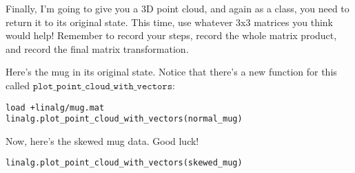 \documentclass{ximera}
\begin{document}
\begin{exploration}

Finally, I'm going to give you a 3D point cloud, and again as a class, you need to return it to its original state. This time, use whatever 3x3 matrices you think would help! Remember to record your steps, record the whole matrix product, and record the final matrix transformation.

Here's the mug in its original state. Notice that there's a new function for this called $\texttt{plot\_point\_cloud\_with\_vectors}$:
\begin{verbatim}
load +linalg/mug.mat
linalg.plot_point_cloud_with_vectors(normal_mug)
\end{verbatim}

Now, here's the skewed mug data. Good luck!
\begin{verbatim}
linalg.plot_point_cloud_with_vectors(skewed_mug)
\end{verbatim}

\end{exploration}
\end{document}
